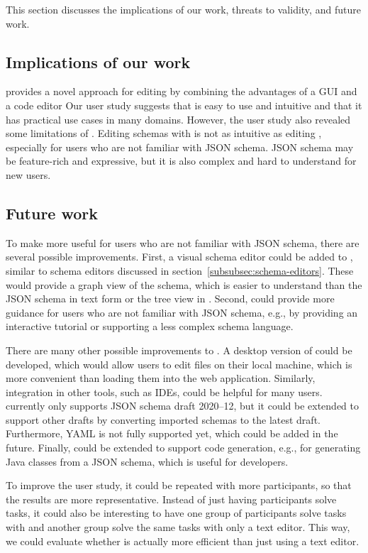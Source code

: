 This section discusses the implications of our work, threats to validity, and future work.


\subsection{Implications of our work}\label{subsec:implications-of-our-work}

\toolname{} provides a novel approach for editing \cfgfiles{}
by combining the advantages of a GUI and a code editor
Our user study suggests that \toolname{} is easy to use and intuitive and
that it has practical use cases in many domains.
However, the user study also revealed some limitations of \toolname{}.
Editing schemas with \toolname{} is not as intuitive as editing \cfgfiles{},
especially for users who are not familiar with JSON schema.
JSON schema may be feature-rich and expressive, but it is also complex and
hard to understand for new users.

\subsection{Future work}\label{subsec:future-work}
To make \toolname{} more useful for users who are not familiar with JSON schema,
there are several possible improvements.
First, a visual schema editor could be added to \toolname{}, similar to schema editors
discussed in section~\ref{subsubsec:schema-editors}.
These would provide a graph view of the schema, which is easier to understand than
the JSON schema in text form or the tree view in \toolname{}.
Second, \toolname{} could provide more guidance for users who are not familiar with JSON schema,
e.g., by providing an interactive tutorial or supporting a less complex schema language.

There are many other possible improvements to \toolname{}.
A desktop version of \toolname{} could be developed, which would allow users to
edit files on their local machine, which is more convenient than loading them into the web application.
Similarly, integration in other tools, such as IDEs, could be helpful for many users.
\toolname{} currently only supports JSON schema draft 2020--12, but it could be extended to support
other drafts by converting imported schemas to the latest draft.
Furthermore, YAML is not fully supported yet, which could be added in the future.
Finally, \toolname{} could be extended to support code generation, e.g., for generating
Java classes from a JSON schema, which is useful for developers.

To improve the user study, it could be repeated with more participants,
so that the results are more representative.
Instead of just having participants solve tasks, it could also be interesting to
have one group of participants solve tasks with \toolname{} and another group solve
the same tasks with only a text editor.
This way, we could evaluate whether \toolname{} is actually more efficient than
just using a text editor.

